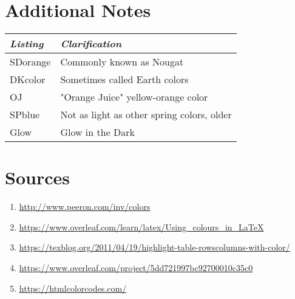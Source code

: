 \documentclass{article}
\begin{document}
\section{Additional Notes}
\begin{l}
\begin{tabular}{|| l | l ||} 
\hline
\textit{Listing} & \textit{Clarification} \\
\hline
\hline
SDorange & Commonly known as Nougat \\
\hline
DKcolor & Sometimes called Earth colors \\
\hline
OJ & "Orange Juice" yellow-orange color \\
\hline
SPblue & Not as light as other spring colors, older \\
\hline
Glow & Glow in the Dark \\
\hline
\end{tabular}
\end{l}
\newline 

\section{Sources}
\begin{enumerate}
\item{\url{http://www.peeron.com/inv/colors}}
\item{\url{https://www.overleaf.com/learn/latex/Using_colours_in_LaTeX}}
\item{\url{https://texblog.org/2011/04/19/highlight-table-rowscolumns-with-color/}}
\item{\url{https://www.overleaf.com/project/5dd721997bc92700010c35c0}}
\item{\url{https://htmlcolorcodes.com/}}
\end{enumerate}
\end{document}
